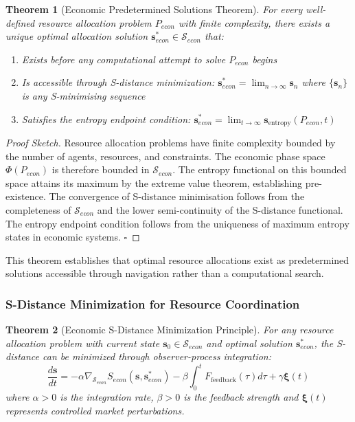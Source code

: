 \documentclass[12pt,a4paper]{article}
\newtheorem{theorem}{Theorem}
\begin{document}
\begin{theorem}[Economic Predetermined Solutions Theorem]
For every well-defined resource allocation problem $P_{econ}$ with finite complexity, there exists a unique optimal allocation solution $\mathbf{s}^*_{econ} \in \mathcal{S}_{econ}$ that:
\begin{enumerate}
\item Exists before any computational attempt to solve $P_{econ}$ begins
\item Is accessible through S-distance minimization: $\mathbf{s}^*_{econ} = \lim_{n \to \infty} \mathbf{s}_n$ where $\{\mathbf{s}_n\}$ is any S-minimising sequence
\item Satisfies the entropy endpoint condition: $\mathbf{s}^*_{econ} = \lim_{t \to \infty} \mathbf{s}_{\text{entropy}}(P_{econ}, t)$
\end{enumerate}
\end{theorem}

\begin{proof}[Proof Sketch]
Resource allocation problems have finite complexity bounded by the number of agents, resources, and constraints. The economic phase space $\Phi(P_{econ})$ is therefore bounded in $\mathcal{S}_{econ}$. The entropy functional on this bounded space attains its maximum by the extreme value theorem, establishing pre-existence. The convergence of S-distance minimisation follows from the completeness of $\mathcal{S}_{econ}$ and the lower semi-continuity of the S-distance functional. The entropy endpoint condition follows from the uniqueness of maximum entropy states in economic systems. $\square$
\end{proof}

This theorem establishes that optimal resource allocations exist as predetermined solutions accessible through navigation rather than a computational search.

\subsubsection{S-Distance Minimization for Resource Coordination}

\begin{theorem}[Economic S-Distance Minimization Principle]
For any resource allocation problem with current state $\mathbf{s}_0 \in \mathcal{S}_{econ}$ and optimal solution $\mathbf{s}^*_{econ}$, the S-distance can be minimized through observer-process integration:
\begin{equation}
\frac{d\mathbf{s}}{dt} = -\alpha \nabla_{\mathcal{S}_{econ}} S_{econ}(\mathbf{s}, \mathbf{s}^*_{econ}) - \beta \int_0^t F_{\text{feedback}}(\tau) d\tau + \gamma \mathbf{\xi}(t)
\end{equation}
where $\alpha > 0$ is the integration rate, $\beta > 0$ is the feedback strength and $\mathbf{\xi}(t)$ represents controlled market perturbations.
\end{theorem}
\end{document}

